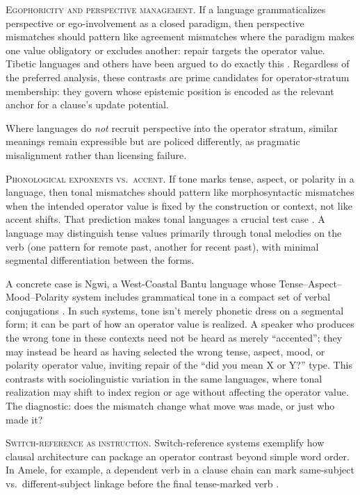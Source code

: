 \documentclass[12pt,letterpaper]{article}
\begin{document}
\textsc{Egophoricity and perspective management.} If a language grammaticalizes perspective or ego-involvement as a closed paradigm, then perspective mismatches should pattern like agreement mismatches where the paradigm makes one value obligatory or excludes another: repair targets the operator value. Tibetic languages and others have been argued to do exactly this \citep{tournadre2008,floydnorcliffesanroque2018}. Regardless of the preferred analysis, these contrasts are prime candidates for operator-stratum membership: they govern whose epistemic position is encoded as the relevant anchor for a clause's update potential.

Where languages do \emph{not} recruit perspective into the operator stratum, similar meanings remain expressible but are policed differently, as pragmatic misalignment rather than licensing failure.

\textsc{Phonological exponents vs.\ accent.} If tone marks tense, aspect, or polarity in a language, then tonal mismatches should pattern like morphosyntactic mismatches when the intended operator value is fixed by the construction or context, not like accent shifts. That prediction makes tonal languages a crucial test case \citep{hyman2011}. A language may distinguish tense values primarily through tonal melodies on the verb (one pattern for remote past, another for recent past), with minimal segmental differentiation between the forms.

A concrete case is Ngwi, a West-Coastal Bantu language whose Tense--Aspect--Mood--Polarity system includes grammatical tone in a compact set of verbal conjugations \citep{pacchiarottibostoen2024ngwi}. In such systems, tone isn't merely phonetic dress on a segmental form; it can be part of how an operator value is realized. A speaker who produces the wrong tone in these contexts need not be heard as merely \enquote{accented}; they may instead be heard as having selected the wrong tense, aspect, mood, or polarity operator value, inviting repair of the \enquote{did you mean X or Y?} type. This contrasts with sociolinguistic variation in the same languages, where tonal realization may shift to index region or age without affecting the operator value. The diagnostic: does the mismatch change what move was made, or just who made it?

\textsc{Switch-reference as instruction.} Switch-reference systems exemplify how clausal architecture can package an operator contrast beyond simple word order. In Amele, for example, a dependent verb in a clause chain can mark same-subject vs.\ different-subject linkage before the final tense-marked verb \citep{roberts1987,roberts1988,roberts2023amele}.
\end{document}
